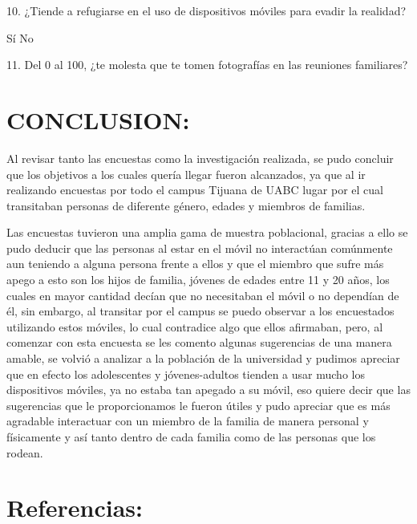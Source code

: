 \documentclass[10pt,a4paper]{article}
\begin{document}
10.	¿Tiende a refugiarse en el uso de dispositivos m{\'o}viles para evadir la realidad?

S{\'i}                       No

11.	Del 0 al 100, ¿te molesta que te tomen fotograf{\'i}as en las reuniones familiares?

	
	\section{CONCLUSION:}

Al revisar tanto las encuestas como la investigaci{\'o}n realizada, se pudo concluir que los objetivos a los cuales quer{\'i}a llegar fueron alcanzados, ya que al ir realizando encuestas por todo el campus Tijuana de UABC lugar por el cual transitaban personas de diferente g{\'e}nero, edades y miembros de familias. 

Las encuestas tuvieron una amplia gama de muestra poblacional, gracias a ello se pudo deducir que las personas al estar en el m{\'o}vil no interact{\'u}an com{\'u}nmente aun teniendo a alguna persona frente a ellos y que el miembro que sufre m{\'a}s apego a esto son los hijos de familia, j{\'o}venes de edades entre 11 y 20 a{\~n}os, los cuales en mayor cantidad dec{\'i}an que no necesitaban el m{\'o}vil o no depend{\'i}an de {\'e}l, sin embargo, al transitar por el campus se puedo observar a los encuestados utilizando estos m{\'o}viles, lo cual contradice algo que ellos afirmaban, pero, al comenzar con esta encuesta se les comento algunas sugerencias de una manera amable, se volvi{\'o} a analizar a la poblaci{\'o}n de la universidad y pudimos apreciar que en efecto los adolescentes y j{\'o}venes-adultos tienden a usar mucho los dispositivos m{\'o}viles, ya no estaba tan apegado a su m{\'o}vil, eso quiere decir que las sugerencias que le proporcionamos le fueron {\'u}tiles y pudo apreciar que es m{\'a}s agradable interactuar con un miembro de la familia de manera personal y f{\'i}sicamente y as{\'i} tanto dentro de cada familia como de las personas que los rodean. 

	
	
	\section{Referencias:}
	
\end{document}
